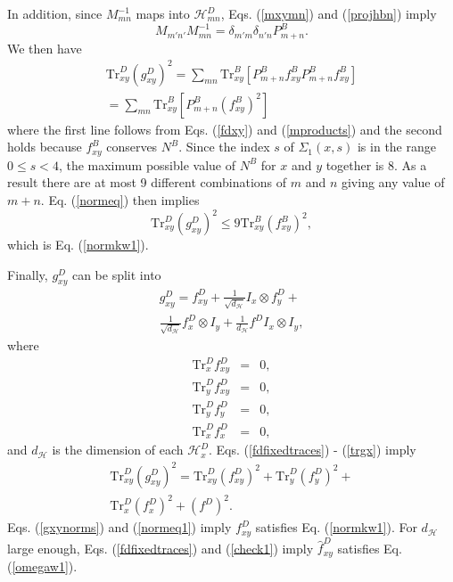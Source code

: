 \documentclass[twocolumn,amsmath,amssymb]{revtex4-1}
\begin{document}
In addition, since $M_{mn}^{-1}$ maps into $\mathcal{H}^D_{mn}$,
Eqs. (\ref{mxymn}) and (\ref{projhbn}) imply 
\begin{equation}
  \label{mproducts}
  M_{m'n'} M_{mn}^{-1} = \delta_{m'm} \delta_{n'n} P^B_{m + n}.
\end{equation}
We then have
\begin{multline}
  \label{normeq}
  \mathrm{Tr}^D_{xy} ( g^D_{xy})^2 = \sum_{mn} \mathrm{Tr}^B_{xy}[ P^B_{m +n} f^B_{xy}P^B_{m+n} f^B_{xy}] \\
  =  \sum_{mn} \mathrm{Tr}^B_{xy}[ P^B_{m +n} (f^B_{xy})^2]
\end{multline}
where the first line follows from Eqs. (\ref{fdxy}) and (\ref{mproducts})
and the second holds because $f^B_{xy}$ conserves $N^B$.
Since the index $s$ of $\Sigma_1(x,s)$ is in the range $0 \le s < 4$,
the maximum possible value of $N^B$ for $x$ and $y$ together is 8.
As a result 
there are at most 9 different combinations of $m$ and $n$
giving any value of $m + n$. Eq. (\ref{normeq}) then implies
\begin{equation}
  \label{normeq1}
    \mathrm{Tr}^D_{xy} ( g^D_{xy})^2 \le 9 \mathrm{Tr}^B_{xy}(f^B_{xy})^2,
\end{equation}
which is Eq. (\ref{normkw1}).

Finally, $g^D_{xy}$ can be split into
\begin{multline}
  \label{fdfixedtraces}
  g^D_{xy} = f^D_{xy} + \frac{1}{\sqrt{d_\mathcal{H}}} I_x \otimes f^D_y + \\
  \frac{1}{\sqrt{d_\mathcal{H}}} f^D_x  \otimes I_y + \frac{1}{d_\mathcal{H}} f^D I_x \otimes I_y,
\end{multline}
where
\begin{subequations}
  \begin{eqnarray}
    \label{trgxy0}
    \mathrm{Tr}^D_x f^D_{xy} & = & 0, \\
    \label{trgxy1}
    \mathrm{Tr}^D_y f^D_{xy} & = & 0, \\
    \label{trgy}
    \mathrm{Tr}^D_y f^D_y & = & 0, \\
    \label{trgx}
    \mathrm{Tr}^D_x f^D_x & = & 0,
  \end{eqnarray}
\end{subequations}
and $d_\mathcal{H}$ is the dimension of each $\mathcal{H}^D_x$.
Eqs. (\ref{fdfixedtraces}) - (\ref{trgx}) imply
\begin{multline}
  \label{gxynorms}
  \mathrm{Tr}^D_{xy}(g^D_{xy})^2 = \mathrm{Tr}^D_{xy}(f^D_{xy})^2 + \mathrm{Tr}^D_y(f^D_y)^2 +
  \\ \mathrm{Tr}^D_x(f^D_x)^2 + (f^D)^2.
\end{multline}
Eqs. (\ref{gxynorms}) and (\ref{normeq1}) imply $f^D_{xy}$ satisfies Eq. (\ref{normkw1}). For $d_\mathcal{H}$ large enough,
Eqs. (\ref{fdfixedtraces}) and (\ref{check1}) imply $\hat{f}^D_{xy}$ satisfies Eq. (\ref{omegaw1}).
\end{document}
